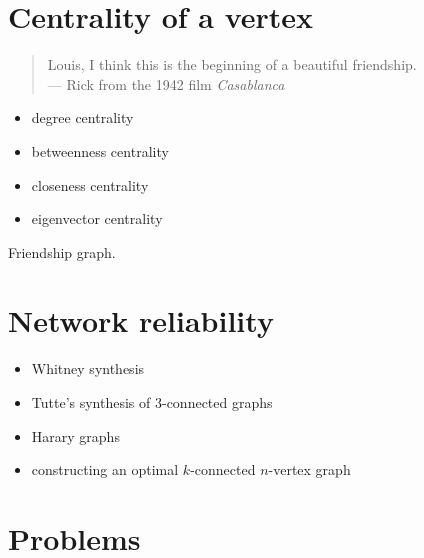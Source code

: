 \section{Centrality of a vertex}

\begin{quote}
\footnotesize
Louis, I think this is the beginning of a beautiful friendship. \\
\noindent
--- Rick from the 1942 film \emph{Casablanca}
\end{quote}

\begin{itemize}
\item degree centrality

\item betweenness centrality

\item closeness centrality

\item eigenvector centrality
\end{itemize}

\begin{algorithm}[!htbp]

\caption{Friendship graph.}
\label{alg:distance_connectivity:friendship_graphs}
\end{algorithm}



\section{Network reliability}

\begin{itemize}
\item Whitney synthesis

\item Tutte's synthesis of $3$-connected graphs

\item Harary graphs

\item constructing an optimal $k$-connected $n$-vertex graph
\end{itemize}



\section{Problems}

